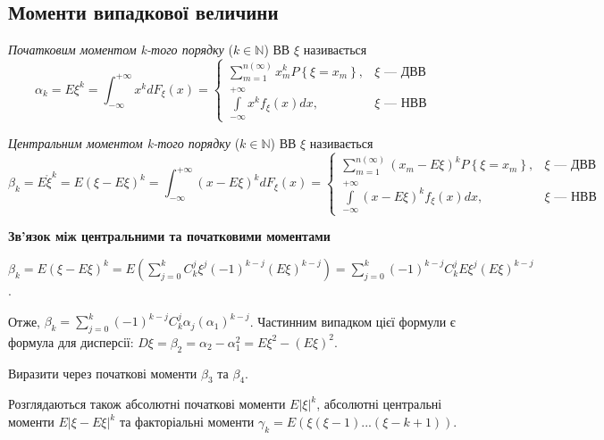 \subsection{Моменти випадкової величини}
\begin{definition}
    \emph{Початковим моментом k-того порядку} ($k \in \mathbb{N}$) ВВ $\xi$ називається
    \begin{equation}\label{eq:e_alpha_k}
        \alpha_k = E\xi^k = \int_{-\infty}^{+\infty} x^k dF_\xi(x) = \begin{cases}
            \sum\limits_{m=1}^{n(\infty)} x_m^k P\left\{\xi = x_m\right\}, & \xi \text{ --- ДВВ} \\
            \int\limits_{-\infty}^{+\infty} x^k f_\xi(x)dx, & \xi \text{ --- НВВ}
        \end{cases}
    \end{equation}
\end{definition}
\begin{definition}
    \emph{Центральним моментом k-того порядку} ($k \in \mathbb{N}$) ВВ $\xi$ називається
    \begin{equation}\label{eq:d_beta_k}
        \beta_k = E\mathring{\xi}^k = E\left(\xi-E\xi\right)^k = \int_{-\infty}^{+\infty} \left(x-E\xi\right)^k dF_\xi(x) = \begin{cases}
            \sum\limits_{m=1}^{n(\infty)} \left(x_m-E\xi\right)^k P\left\{\xi = x_m\right\}, & \xi \text{ --- ДВВ} \\
            \int\limits_{-\infty}^{+\infty} \left(x-E\xi\right)^k f_\xi(x)dx, & \xi \text{ --- НВВ}
        \end{cases}
    \end{equation}
\end{definition}

\noindent \textbf{Зв'язок між центральними та початковими моментами}

$\beta_k = E\left(\xi-E\xi\right)^k = E\left( \sum\limits_{j=0}^k C_k^j \xi^j (-1)^{k-j} (E\xi)^{k-j}\right) =
\sum\limits_{j=0}^k (-1)^{k-j} C_k^j E\xi^j (E\xi)^{k-j}$.

\noindent Отже, $\beta_k = \sum\limits_{j=0}^k (-1)^{k-j} C_k^j \alpha_j (\alpha_1)^{k-j}$.
Частинним випадком цієї формули є формула для дисперсії: $D\xi = \beta_2 = \alpha_2 - \alpha_1^2 = E\xi^2 - (E\xi)^2$.
\begin{exercise}
    Виразити через початкові моменти $\beta_3$ та $\beta_4$.
\end{exercise}
Розглядаються також абсолютні початкові моменти $E\vert \xi \vert ^k$, абсолютні центральні моменти $E\vert \xi - E\xi \vert ^k$
та факторіальні моменти $\gamma_k = E\left( \xi (\xi - 1) ... (\xi - k + 1)\right)$.


